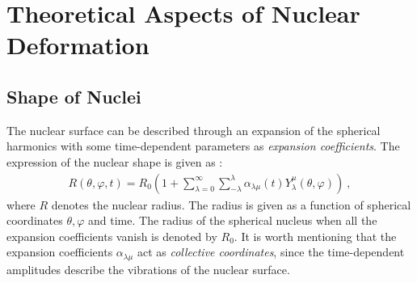 \chapter{Theoretical Aspects of Nuclear Deformation}
\label{theoretical-aspects}
\section{Shape of Nuclei}
\label{nuclear-shapes}

The nuclear surface can be described through an expansion of the spherical harmonics with some time-dependent parameters as \emph{expansion coefficients}. The expression of the nuclear shape is given as \cite{greiner1996nuclear}:
\begin{align}
    R(\theta,\varphi,t)=R_0\left(1+\sum_{\lambda=0}^\infty\sum_{-\lambda}^\lambda\alpha_{\lambda\mu}(t)Y_\lambda^\mu(\theta,\varphi)\right)\ ,
    \label{nuclear-shape}
\end{align}
where $R$ denotes the nuclear radius. The radius is given as a function of spherical coordinates $\theta,\varphi$ and time. The radius of the spherical nucleus when all the expansion coefficients vanish is denoted by $R_0$. It is worth mentioning that the expansion coefficients $\alpha_{\lambda\mu}$ act as \emph{collective coordinates}, since the time-dependent amplitudes describe the vibrations of the nuclear surface.





